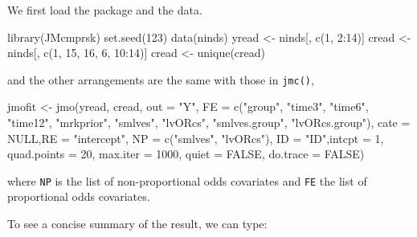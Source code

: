 We first load the package and the data.

\begin{example}
library(JMcmprsk)
set.seed(123)
data(ninds)
yread <- ninds[, c(1, 2:14)]
cread <- ninds[, c(1, 15, 16, 6, 10:14)]
cread <- unique(cread)
\end{example}

and the other arrangements are the same with those in \texttt{jmc()},
\begin{example}
jmofit <- jmo(yread, cread, out = "Y",
              FE = c("group", "time3", "time6", "time12", "mrkprior",
                     "smlves", "lvORcs", "smlves.group", "lvORcs.group"),
              cate = NULL,RE = "intercept", NP = c("smlves", "lvORcs"),
              ID = "ID",intcpt = 1, quad.points = 20,
              max.iter = 1000, quiet = FALSE, do.trace = FALSE)
\end{example}
where \texttt{NP} is the list of non-proportional odds covariates and \texttt{FE} the list of proportional odds covariates.

To see a concise summary of the result, we can type:

